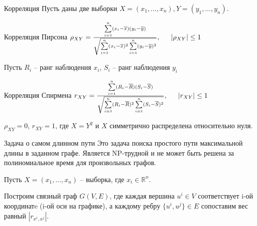 \documentclass[fleqn, xcolor=x11names]{beamer}
\begin{document}
\begin{frame}{Корреляция}
    Пусть даны две выборки $X=(x_1, \ldots ,x_n), Y=(y_1,\ldots ,y_n)$.

    \begin{block}{Корреляция Пирсона}
            \centering
            $\rho_{XY} = 
            \frac{\sum\limits_{i=1}^{n}(x_i-\overline x)(y_i-\overline y)}
            {\sqrt{\sum\limits_{i=1}^{n}(x_i-\overline x)^2\sum\limits_{i=1}^{n}(y_i-\overline y)^2}}, 
            \hspace{15px} \left\lvert \rho_{XY} \right\rvert \leq 1$
    \end{block}

    Пусть $R_i$ -- ранг наблюдения $x_i$, $S_i$ -- ранг наблюдения $y_i$

    \begin{block}{Корреляция Спирмена}
        \centering
        $r_{XY} = 
        \frac{\sum\limits_{i=1}^{n}(R_i-\overline R)(S_i-\overline S)}
        {\sqrt{\sum\limits_{i=1}^{n}(R_i-\overline R)^2\sum\limits_{i=1}^{n}(S_i-\overline S)^2}},
        \hspace{15px} \left\lvert r_{XY} \right\rvert \leq 1$
    \end{block}
    $\rho_{XY} = 0$, $r_{XY} = 1$, где $X=Y^2$ и $X$ симметрично распределена относительно нуля.

\end{frame}

\begin{frame}{}

    \begin{block}{Задача о самом длинном пути}
    Это задача поиска простого пути максимальной длины в заданном графе.
    Является NP-трудной и не может быть решена за 
    полиномиальное время для произвольных графов.
    \end{block}

    \vspace{10px}

    Пусть $X=(x_1,\ldots,x_n)$ -- выборка, где $x_i\in \mathbb{R}^n$. 

    \vspace{10px}

    Построим связный граф $G(V,E)$, где каждая вершина $u^i \in V$ соответствует
    i-ой координатe (i-ой оси на графике), а каждому ребру $\{u^i,u^j\} \in E$ сопоставим вес равный $|r_{x^i,x^j}|$.

\end{frame}
\end{document}
